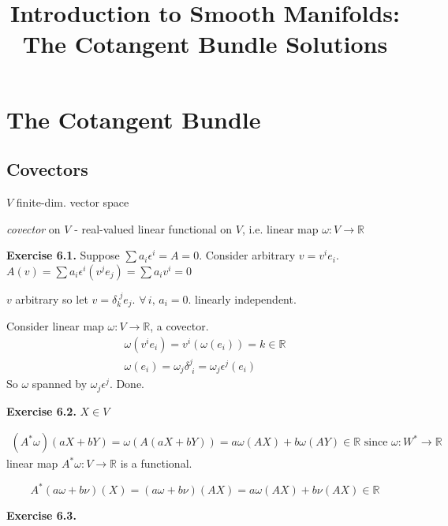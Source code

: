 \documentclass[11pt]{amsart}
\title{Introduction to Smooth Manifolds: The Cotangent Bundle Solutions}
\theoremstyle{definition}
\newcommand{\exercisehead}[1]{\medskip\noindent\textbf{Exercise #1.} }
\begin{document}
\maketitle
\section{The Cotangent Bundle}


\subsection*{ Covectors }

$V$ finite-dim. vector space

\emph{covector} on $V$ - real-valued linear functional on $V$, i.e. linear map $\omega : V\to \mathbb{R}$



\exercisehead{6.1} Suppose $\sum a_i \epsilon^i = A = 0$.  Consider arbitrary $v= v^i e_i$.  $A(v) = \sum a_i \epsilon^i (v^j e_j) = \sum a_i v^i = 0 $

$v$ arbitrary so let $v = \delta_k^{\, \, j} e_j$.  $\forall \, i, \, a_i =0$.  linearly independent.

Consider linear map $\omega: V \to \mathbb{R}$, a covector.
\[
\begin{gathered}
  \omega (v^i e_i ) = v^i(\omega( e_i)) = k \in \mathbb{R} \\
  \omega(e_i) = \omega_j \delta^j_{\, \, i} = \omega_j \epsilon^j( e_i)
\end{gathered}
\]
So $\omega$ spanned by $\omega_j \epsilon^j$.  Done.



\exercisehead{6.2} $X \in V$

\[
\begin{gathered}
  (A^* \omega)(aX + bY) = \omega(A (aX + bY)) = a\omega(AX) + b \omega(AY) \in \mathbb{R} \text{ since } \omega: W^* \to \mathbb{R}
\end{gathered}
\]
linear map $A^* \omega :V \to \mathbb{R}$ is a functional.

\[
A^*(a\omega + b\nu)(X) = (a\omega + b\nu )(AX) = a\omega(AX)+ b \nu(AX) \in \mathbb{R}
\]

\exercisehead{6.3}
\end{document}
